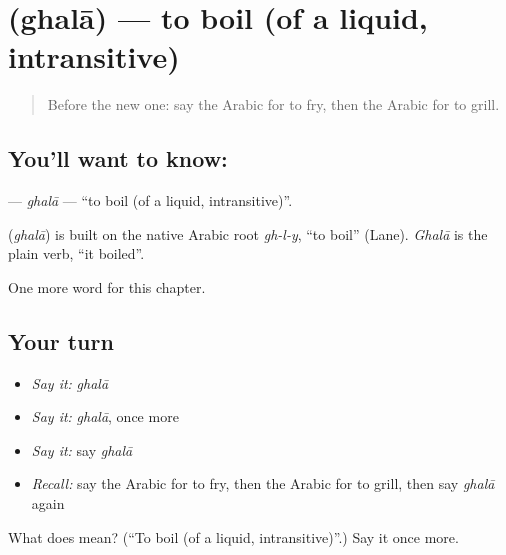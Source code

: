 \section[\texorpdfstring{\ar{غلى} (ghalā)}{غلى (ghalā)}]{ (ghalā) — to boil (of a liquid, intransitive)}

\label{lesson:AR-C254-ghala}



\begin{quote}
Before the new one: say the Arabic for to fry, then the Arabic for to grill.
\end{quote}

\subsection*{You'll want to know: }
\textbf{} — \emph{ghalā} — \textquotedblleft{}to boil (of a liquid, intransitive)\textquotedblright{}.

\begin{cousinweb}
\textbf{} (\emph{ghalā}) is built on the native Arabic root \emph{gh-l-y}, \textquotedblleft{}to boil\textquotedblright{} (Lane). \emph{Ghalā} is the plain verb, \textquotedblleft{}it boiled\textquotedblright{}.
\end{cousinweb}

\begin{grammarlens}[title={What you've built}]
One more word for this chapter.
\end{grammarlens}

\subsection*{Your turn}
\begin{itemize}
\raggedright
  \item \emph{Say it:} \emph{ghalā}
  \item \emph{Say it:} \emph{ghalā}, once more
  \item \emph{Say it:} say \emph{ghalā}
  \item \emph{Recall:} say the Arabic for to fry, then the Arabic for to grill, then say \emph{ghalā} again
\end{itemize}

\begin{tcolorbox}[breakable,colback=teal!4,colframe=teal!35!black,title={Before you move on}]
What does  mean? (\textquotedblleft{}To boil (of a liquid, intransitive)\textquotedblright{}.) Say it once more.
\end{tcolorbox}
